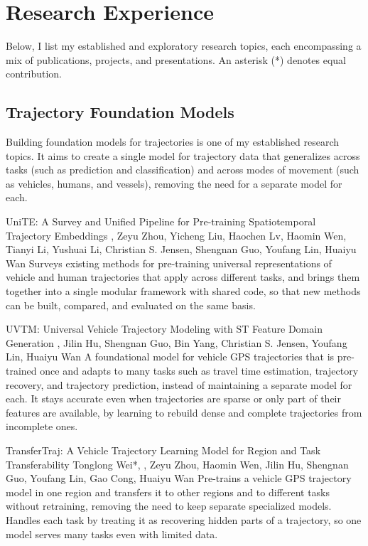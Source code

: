 \section*{Research Experience}
Below, I list my established and exploratory research topics, each encompassing a mix of publications, projects, and presentations.
An asterisk (*) denotes equal contribution.
\listsnote

\subsection*{Trajectory Foundation Models}
Building foundation models for trajectories is one of my established research topics. It aims to create a single model for trajectory data that generalizes across tasks (such as prediction and classification) and across modes of movement (such as vehicles, humans, and vessels), removing the need for a separate model for each.

{UniTE: A Survey and Unified Pipeline for Pre-training Spatiotemporal Trajectory Embeddings}
{\me, Zeyu Zhou, Yicheng Liu, Haochen Lv, Haomin Wen, Tianyi Li, Yushuai Li, Christian S. Jensen, Shengnan Guo, Youfang Lin, Huaiyu Wan}
{Surveys existing methods for pre-training universal representations of vehicle and human trajectories that apply across different tasks, and brings them together into a single modular framework with shared code, so that new methods can be built, compared, and evaluated on the same basis.}

{UVTM: Universal Vehicle Trajectory Modeling with ST Feature Domain Generation}
{\me, Jilin Hu, Shengnan Guo, Bin Yang, Christian S. Jensen, Youfang Lin, Huaiyu Wan}
{A foundational model for vehicle GPS trajectories that is pre-trained once and adapts to many tasks such as travel time estimation, trajectory recovery, and trajectory prediction, instead of maintaining a separate model for each. It stays accurate even when trajectories are sparse or only part of their features are available, by learning to rebuild dense and complete trajectories from incomplete ones.}

{TransferTraj: A Vehicle Trajectory Learning Model for Region and Task Transferability}
{Tonglong Wei*, \me*, Zeyu Zhou, Haomin Wen, Jilin Hu, Shengnan Guo, Youfang Lin, Gao Cong, Huaiyu Wan}
{Pre-trains a vehicle GPS trajectory model in one region and transfers it to other regions and to different tasks without retraining, removing the need to keep separate specialized models. Handles each task by treating it as recovering hidden parts of a trajectory, so one model serves many tasks even with limited data.}

